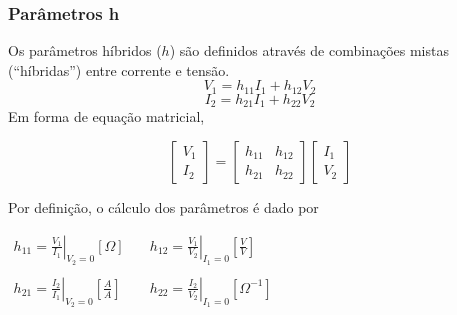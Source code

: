 \documentclass{article}
\numberwithin{equation}{section}
\let\dfr\dfrac
\begin{document}
\begin{center}
\end{center}

\subsubsection{Parâmetros h}
\label{subsubsec:quadripolosh}
Os parâmetros híbridos ($h$) são definidos através de combinações mistas (``híbridas'') entre corrente e tensão.
\begin{equation*}
    V_{1}=h_{11}I_{1}+h_{12}V_{2}
\end{equation*}
\begin{equation*}
    I_{2}=h_{21}I_{1}+h_{22}V_{2}
\end{equation*}
Em forma de equação matricial,

\begin{equation}
    \begin{bmatrix}
        V_{1} \\
        I_{2}
    \end{bmatrix}
    = %
    \begin{bmatrix}
        h_{11} & h_{12} \\
        h_{21} & h_{22}
    \end{bmatrix}
    \begin{bmatrix}
        I_{1} \\
        V_{2}
    \end{bmatrix}
\end{equation}

\noindent Por definição, o cálculo dos parâmetros é dado por
\begin{center}
    $\begin{matrix} %
            h_{11}=\displaystyle\left.\frac{V_{1}}{I_{1}}\right|_{V_{2}=0} [\Omega] &\quad h_{12}=\displaystyle\left.\frac{V_{1}}{V_{2}}\right|_{I_{1}=0}\left[\frac{V}{V}\right]\\\\
            h_{21}=\displaystyle\left.\frac{I_{2}}{I_{1}}\right|_{V_{2}=0}\left[\frac{A}{A}\right]&\quad
            h_{22}=\displaystyle\left.\frac{I_{2}}{V_{2}}\right|_{I_{1}=0} [\Omega^{-1}]
    \end{matrix}$
\end{center}
\end{document}
